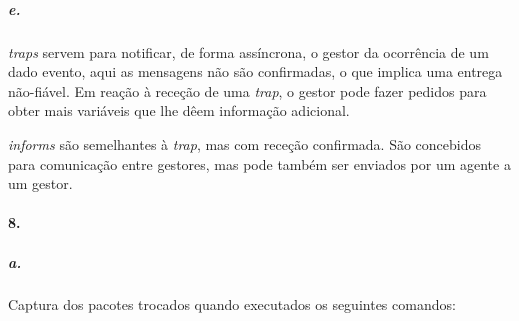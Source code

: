\subparagraph{e.}
\emph{traps} servem para notificar, de forma assíncrona, o gestor da ocorrência de um dado evento, aqui as mensagens não são confirmadas, o que implica uma entrega não-fiável. Em reação à receção de uma \emph{trap}, o gestor pode fazer pedidos para
obter mais variáveis que lhe dêem informação adicional.

\emph{informs} são semelhantes à \emph{trap}, mas com receção confirmada. São concebidos para comunicação entre gestores, mas pode também ser enviados por um agente a um gestor.


\paragraph{8.}

\subparagraph{a.}
Captura dos pacotes trocados quando executados os seguintes comandos:

